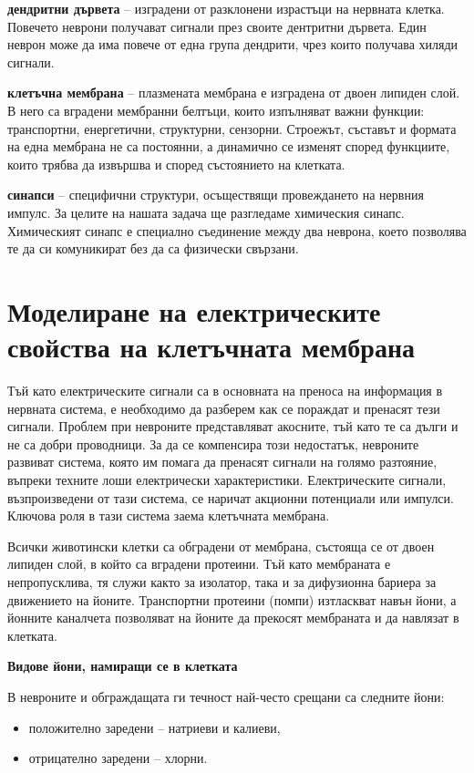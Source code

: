 \documentclass{article}
\numberwithin{equation}{section}
\begin{document}
\textbf{дендритни дървета} -- изградени от разклонени израстъци на нервната клетка. Повечето неврони получават сигнали през своите дентритни
дървета. Един неврон може да има повече от една група дендрити, чрез които получава хиляди сигнали.

\textbf{клетъчна мембрана} -- плазмената мембрана е изградена от двоен липиден слой. В него са вградени мембранни белтъци, които изпълняват
важни функции: транспортни, енергетични, структурни, сензорни. Строежът, съставът и формата на една мембрана не са постоянни, а динамично се
изменят според функциите, които трябва да извършва и според състоянието на клетката.

\textbf{синапси} -- специфични структури, осъществящи провеждането на нервния импулс. За целите на нашата задача ще разгледаме химическия
синапс. Химическият синапс е специално съединение между два неврона, което позволява те да си комуникират без да са физически свързани.

\section{Моделиране на електрическите свойства на клетъчната мембрана} Тъй като електрическите сигнали са в основната на преноса на
информация в нервната система, е необходимо да разберем как се пораждат и пренасят тези сигнали. Проблем при невроните представляват
акосните, тъй като те са дълги и не са добри проводници. За да се компенсира този недостатък, невроните развиват система, която им помага да
пренасят сигнали на голямо разтояние, въпреки техните лоши електрически характеристики.  Електрическите сигнали, възпроизведени от тази
система, се наричат акционни потенциали или импулси. Ключова роля в тази система заема клетъчната мембрана.

Всички животински клетки са обградени от мембрана, състояща се от двоен липиден слой, в който са вградени протеини. Тъй като мембраната е
непропусклива, тя служи както за изолатор, така и за дифузионна бариера за движението на йоните. Транспортни протеини (помпи) изтласкват
навън йони, а йонните каналчета позволяват на йоните да прекосят мембраната и да навлязат в клетката.

\vspace{5mm} %
\textbf{Видове йони, намиращи се в клетката}

В невроните и обграждащата ги течност най-често срещани са следните йони:
\begin{itemize}
  \item положително заредени -- натриеви и калиеви,
  \item отрицателно заредени -- хлорни.
\end{itemize}
\end{document}
